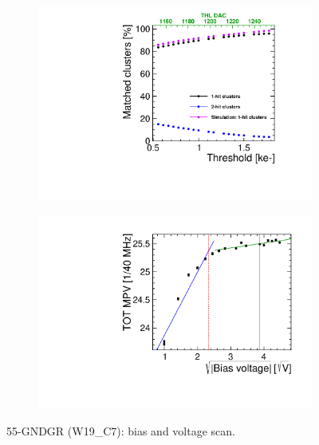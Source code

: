 \begin{figure}[htbp] \centering
  \begin{subfigure}[b]{0.45\textwidth}
    \includegraphics[width=\textwidth]{./figures/TestBeam/ThresholdScan_W0019_C07.pdf}
    \caption{}
  \end{subfigure} \hfill
  \begin{subfigure}[b]{0.45\textwidth}
    \includegraphics[width=\textwidth]{./figures/TestBeam/depletionVoltage_W0019_C07.pdf}
    \caption{}
  \end{subfigure}
  \caption{55-GNDGR (W19\_C7): bias and voltage scan.}
  \label{fig:Timepix3_THLscan_Vdep_C7}
\end{figure}

